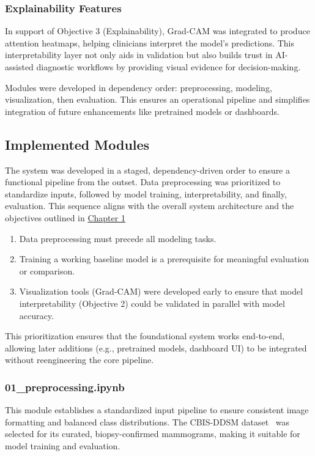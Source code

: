 \documentclass[12pt]{article}
\begin{document}
\subsubsection{Explainability Features}
In support of {Objective 3 (Explainability)}, Grad-CAM was integrated to produce attention heatmaps, helping clinicians interpret the model’s predictions. This interpretability layer not only aids in validation but also builds trust in AI-assisted diagnostic workflows by providing visual evidence for decision-making.

Modules were developed in dependency order: preprocessing, modeling, visualization, then evaluation. This ensures an operational pipeline and simplifies integration of future enhancements like pretrained models or dashboards.


\subsection{Implemented Modules}
The system was developed in a staged, dependency-driven order to ensure a functional pipeline from the outset. Data preprocessing was prioritized to standardize inputs, followed by model training, interpretability, and finally, evaluation. This sequence aligns with the overall system architecture and the objectives outlined in \hyperref[chapter1]{Chapter 1}

\begin{enumerate}
    \item Data preprocessing must precede all modeling tasks.
    \item Training a working baseline model is a prerequisite for meaningful evaluation or comparison.
    \item Visualization tools (Grad-CAM) were developed early to ensure that model interpretability (Objective 2) could be validated in parallel with model accuracy.
\end{enumerate}

This prioritization ensures that the foundational system works end-to-end, allowing later additions (e.g., pretrained models, dashboard UI) to be integrated without reengineering the core pipeline.


\subsubsection{01\_preprocessing.ipynb}

This module establishes a standardized input pipeline to ensure consistent image formatting and balanced class distributions. The CBIS-DDSM dataset~\cite{18} was selected for its curated, biopsy-confirmed mammograms, making it suitable for model training and evaluation.
\end{document}
